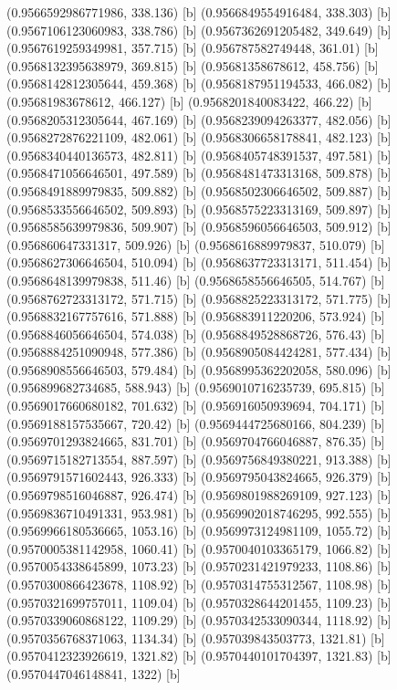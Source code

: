 {{{(0.9566592986771986, 338.136) [b] 
(0.9566849554916484, 338.303) [b] 
(0.9567106123060983, 338.786) [b] 
(0.9567362691205482, 349.649) [b] 
(0.9567619259349981, 357.715) [b] 
(0.956787582749448, 361.01) [b] 
(0.9568132395638979, 369.815) [b] 
(0.95681358678612, 458.756) [b] 
(0.9568142812305644, 459.368) [b] 
(0.9568187951194533, 466.082) [b] 
(0.95681983678612, 466.127) [b] 
(0.9568201840083422, 466.22) [b] 
(0.9568205312305644, 467.169) [b] 
(0.9568239094263377, 482.056) [b] 
(0.9568272876221109, 482.061) [b] 
(0.9568306658178841, 482.123) [b] 
(0.9568340440136573, 482.811) [b] 
(0.9568405748391537, 497.581) [b] 
(0.9568471056646501, 497.589) [b] 
(0.9568481473313168, 509.878) [b] 
(0.9568491889979835, 509.882) [b] 
(0.9568502306646502, 509.887) [b] 
(0.9568533556646502, 509.893) [b] 
(0.9568575223313169, 509.897) [b] 
(0.9568585639979836, 509.907) [b] 
(0.9568596056646503, 509.912) [b] 
(0.956860647331317, 509.926) [b] 
(0.9568616889979837, 510.079) [b] 
(0.9568627306646504, 510.094) [b] 
(0.9568637723313171, 511.454) [b] 
(0.9568648139979838, 511.46) [b] 
(0.9568658556646505, 514.767) [b] 
(0.9568762723313172, 571.715) [b] 
(0.9568825223313172, 571.775) [b] 
(0.9568832167757616, 571.888) [b] 
(0.956883911220206, 573.924) [b] 
(0.9568846056646504, 574.038) [b] 
(0.9568849528868726, 576.43) [b] 
(0.9568884251090948, 577.386) [b] 
(0.9568905084424281, 577.434) [b] 
(0.9568908556646503, 579.484) [b] 
(0.9568995362202058, 580.096) [b] 
(0.956899682734685, 588.943) [b] 
(0.9569010716235739, 695.815) [b] 
(0.9569017660680182, 701.632) [b] 
(0.956916050939694, 704.171) [b] 
(0.9569188157535667, 720.42) [b] 
(0.9569444725680166, 804.239) [b] 
(0.9569701293824665, 831.701) [b] 
(0.9569704766046887, 876.35) [b] 
(0.9569715182713554, 887.597) [b] 
(0.9569756849380221, 913.388) [b] 
(0.9569791571602443, 926.333) [b] 
(0.9569795043824665, 926.379) [b] 
(0.9569798516046887, 926.474) [b] 
(0.9569801988269109, 927.123) [b] 
(0.9569836710491331, 953.981) [b] 
(0.9569902018746295, 992.555) [b] 
(0.9569966180536665, 1053.16) [b] 
(0.9569973124981109, 1055.72) [b] 
(0.9570005381142958, 1060.41) [b] 
(0.9570040103365179, 1066.82) [b] 
(0.9570054338645899, 1073.23) [b] 
(0.9570231421979233, 1108.86) [b] 
(0.9570300866423678, 1108.92) [b] 
(0.9570314755312567, 1108.98) [b] 
(0.9570321699757011, 1109.04) [b] 
(0.9570328644201455, 1109.23) [b] 
(0.9570339060868122, 1109.29) [b] 
(0.9570342533090344, 1118.92) [b] 
(0.9570356768371063, 1134.34) [b] 
(0.957039843503773, 1321.81) [b] 
(0.9570412323926619, 1321.82) [b] 
(0.9570440101704397, 1321.83) [b] 
(0.9570447046148841, 1322) [b] 
}}}
